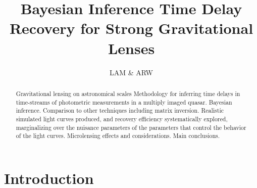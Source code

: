 \documentclass{emulateapj}
\begin{document}
\title{Bayesian Inference Time Delay Recovery for Strong Gravitational Lenses}

\author{LAM \& ARW}

\begin{abstract}
Gravitational lensing on astronomical scales Methodology for inferring time delays in time-streams of photometric
measurements in a multiply imaged quasar.  Bayesian
inference. Comparison to other techniques including matrix inversion.
Realistic simulated light curves produced, and recovery efficiency
systematically explored, marginalizing over the nuisance parameters of
the parameters that control the behavior of the light curves.
Microlensing effects and considerations.  Main conclusions.
\end{abstract}
 

\section{Introduction}



\end{document}
